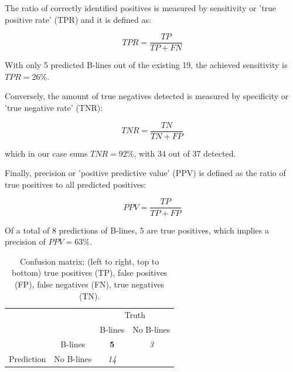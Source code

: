 \documentclass[12pt]{article} %
\begin{document}
	The ratio of correctly identified positives is measured by sensitivity or 'true positive rate' (TPR) and it is defined as:
	
	\[ TPR = \frac{TP}{TP + FN} \]
	
	With only 5 predicted B-lines out of the existing 19, the achieved sensitivity is $ TPR = 26 \% $.

	Conversely, the amount of true negatives detected is measured by specificity or 'true negative rate' (TNR):
	
	\[ TNR = \frac{TN}{TN + FP} \]
	
	which in our case sums $ TNR = 92\%$, with 34 out of 37 detected.
	
	Finally, precision or 'positive predictive value' (PPV) is defined as the ratio of true positives to all predicted positives:
	
	\[ 	PPV = \frac{TP}{TP + FP} \]
	
	 Of a total of 8 predictions of B-lines, 5 are true positives, which implies a precision of $ PPV = 63\% $.
	

\begin{table}[]
\centering
\begin{tabular}{cccc}
\multicolumn{2}{c}{}                                                                & \multicolumn{2}{c}{Truth}                                                                                                                  \\ \cline{3-4} 
\multicolumn{2}{c}{\multirow{-2}{*}{}}                                              & \multicolumn{1}{c|}{B-lines}                             & \multicolumn{1}{c|}{No B-lines}                                                 \\ \cline{2-4} 
\multicolumn{1}{c|}{}                             & \multicolumn{1}{c|}{B-lines}    & \multicolumn{1}{c|}{\cellcolor[HTML]{3399FF}\textbf{5}}  & \multicolumn{1}{c|}{\cellcolor[HTML]{FF9933}\textit{3}}                         \\ \cline{2-4} 
\multicolumn{1}{c|}{\multirow{-2}{*}{Prediction}} & \multicolumn{1}{c|}{No B-lines} & \multicolumn{1}{c|}{\cellcolor[HTML]{3399FF}\textit{14}} & \multicolumn{1}{c|}{\cellcolor[HTML]{FF9933}{\color[HTML]{333333} \textbf{34}}} \\ \cline{2-4} 
\end{tabular}
\caption{Confusion matrix: (left to right, top to bottom) true positives (TP), false positives (FP), false negatives (FN), true negatives (TN).}
\end{table}
	
\end{document}
